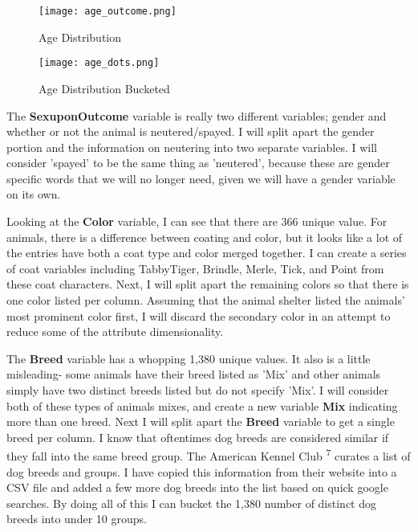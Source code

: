 \documentclass[12pt]{article} %
\begin{document}
\begin{figure}[!htb]
  \centering
  \texttt{[image: age\_outcome.png]}                  
  \caption{Age Distribution}
  \label{fig:OutcomeType}
\end{figure}


\begin{figure}[!htb]
  \centering
  \texttt{[image: age\_dots.png]}                  
  \caption{Age Distribution Bucketed}
  \label{fig:OutcomeType}
\end{figure}

\newpage
\newpage

The \textbf{SexuponOutcome} variable is really two different variables; gender and whether or not the animal is neutered/spayed. I will split apart the gender portion and the information on neutering into two separate variables. I will consider 'spayed' to be the same thing as 'neutered', because these are gender specific words that we will no longer need, given we will have a gender variable on its own. 

Looking at the \textbf{Color} variable, I can see that there are 366 unique value. For animals, there is a difference between coating and color, but it looks like a lot of the entries have both a coat type and color merged together. I can create a series of coat variables including TabbyTiger, Brindle, Merle, Tick, and Point from these coat characters. Next, I will split apart the remaining colors so that there is one color listed per column. Assuming that the animal shelter listed the animals' most prominent color first, I will discard the secondary color in an attempt to reduce some of the attribute dimensionality. 

The \textbf{Breed} variable has a whopping 1,380 unique values. It also is a little misleading- some animals have their breed listed as 'Mix' and other animals simply have two distinct breeds listed but do not specify 'Mix'. I will consider both of these types of animals mixes, and create a new variable \textbf{Mix} indicating more than one breed. Next I will split apart the \textbf{Breed} variable to get a single breed per column. I know that oftentimes dog breeds are considered similar if they fall into the same breed group. The American Kennel Club \textsuperscript{7} curates a list of dog breeds and groups. I have copied this information from their website into a CSV file and added a few more dog breeds into the list based on quick google searches. By doing all of this I can bucket the 1,380 number of distinct dog breeds into under 10 groups. 
\end{document}
